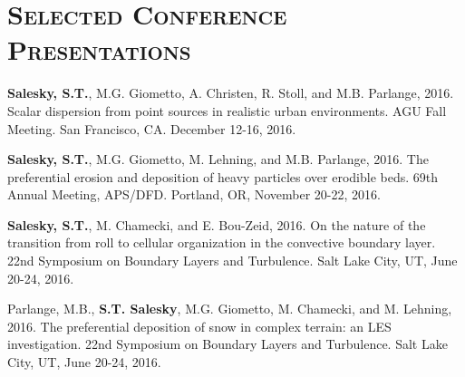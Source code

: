 \documentclass[11pt,letterpaper]{article}
\begin{document}
\section*{\textsc{Selected Conference Presentations}} 



\textbf{Salesky, S.T.}, M.G. Giometto, A. Christen, R. Stoll, and M.B. Parlange,
2016.  Scalar dispersion from point sources in realistic urban environments.
AGU Fall Meeting. San Francisco, CA. December 12-16, 2016.



\textbf{Salesky, S.T.}, M.G. Giometto, M. Lehning, and M.B. Parlange, 2016.
The preferential erosion and deposition of heavy particles over erodible beds.
69th Annual Meeting, APS/DFD. Portland, OR, November 20-22, 2016. 

\textbf{Salesky, S.T.}, M. Chamecki, and E. Bou-Zeid, 2016. On the nature of the
transition from roll to cellular organization in the convective boundary layer.
22nd Symposium on Boundary Layers and Turbulence. Salt Lake City, UT, June
20-24, 2016.

Parlange, M.B., \textbf{S.T. Salesky}, M.G. Giometto, M. Chamecki, and M.
Lehning, 2016.  The preferential deposition of snow in complex terrain: an LES
investigation.  22nd Symposium on Boundary Layers and Turbulence. Salt Lake
City, UT, June 20-24, 2016.

\end{document}
